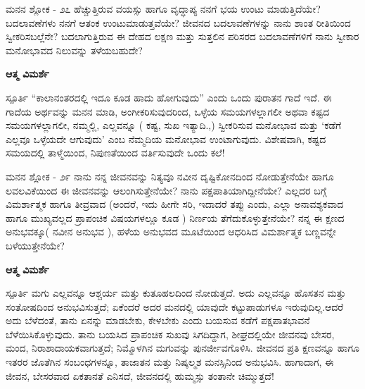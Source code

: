 \newpage
\begin{mananam}{\mananamfont \large ಮನನ ಶ್ಲೋಕ - ೨೭}
\footnotesize \mananamtext ಹೆಚ್ಚುತ್ತಿರುವ ವಯಸ್ಸು ಹಾಗೂ ವೃದ್ಧಾಪ್ಯ  ನನಗೆ ಭಯ ಉಂಟು ಮಾಡುತ್ತಿದೆಯೇ? ಬದಲಾವಣೆಗಳು ನನಗೆ ಆತಂಕ ಉಂಟುಮಾಡುತ್ತವೆಯೇ? ಜೀವನದ ಬದಲಾವಣೆಗಳನ್ನು ನಾನು ಶಾಂತ ರೀತಿಯಿಂದ ಸ್ವೀಕರಿಸಬಲ್ಲೆನೇ? ಬದಲಾಗುತ್ತಿರುವ ಈ ದೇಹದ ಲಕ್ಷಣ ಮತ್ತು ಸುತ್ತಲಿನ ಪರಿಸರದ ಬದಲಾವಣೆಗಳಿಗೆ ನಾನು ಸ್ವೀಕಾರ ಮನೋಭಾವದ ನಿಲುವನ್ನು ತಳೆಯಬಹುದೇ?
\end{mananam}
\WritingHand\enspace\textbf{ಆತ್ಮ ವಿಮರ್ಶೆ}
\begin{inspiration}{\mananamfont \large ಸ್ಪೂರ್ತಿ}
\footnotesize \mananamtext  “ಕಾಲಾನಂತರದಲ್ಲಿ ಇದೂ ಕೂಡ ಹಾದು ಹೋಗುವುದು”  ಎಂದು ಒಂದು ಪುರಾತನ ಗಾದೆ ಇದೆ. ಈ ಗಾದೆಯ ಅರ್ಥವನ್ನು ಮನನ ಮಾಡಿ, ಅಂಗೀಕರಿಸುವುದರಿಂದ,  ಒಳ್ಳೆಯ ಸಮಯಗಳಲ್ಲಾಗಲೀ ಅಥವಾ ಕಷ್ಟದ ಸಮಯಗಳಲ್ಲಾಗಲೀ, ನಮ್ಮಲ್ಲಿ, ಎಲ್ಲವನ್ನೂ ( ಕಷ್ಟ, ಸುಖ ಇತ್ಯಾದಿ.,) ಸ್ವೀಕರಿಸುವ ಮನೋಭಾವ ಮತ್ತು  ‘ಕಡೆಗೆ ಎಲ್ಲವೂ ಒಳ್ಳೆಯದೇ  ಆಗುವುದು’ ಎಂಬ ನೆಮ್ಮದಿಯ ಮನೋಭಾವ ಉಂಟಾಗುವುದು. ವಿಶೇಷವಾಗಿ, ಕಷ್ಟದ ಸಮಯದಲ್ಲಿ ತಾಳ್ಮೆಯಿಂದ, ನಿಪುಣತೆಯಿಂದ ವರ್ತಿಸುವುದೇ ಒಂದು ಕಲೆ!
\end{inspiration}
\newpage


\begin{mananam}{\mananamfont \large ಮನನ ಶ್ಲೋಕ - ೨೯}
\footnotesize \mananamtext ನಾನು ನನ್ನ ಜೀವನವನ್ನು ನಿತ್ಯವೂ ನವೀನ ದೃಷ್ಟಿಕೋನದಿಂದ ನೋಡುತ್ತೇನೆಯೇ ಹಾಗೂ ಲವಲವಿಕೆಯಿಂದ ಈ ಜೀವನವನ್ನು ಆಲಂಗಿಸುತ್ತೇನೆಯೇ? ನಾನು ಪಕ್ಷಪಾತಿಯಾಗಿದ್ದೀನೆಯೇ? ಎಲ್ಲದರ ಬಗ್ಗೆ ವಿಮರ್ಶಾತ್ಮಕ ಹಾಗೂ ತೀವ್ರವಾದ (ಅಂದರೆ, ಇದು ಹೀಗೇ ಸರಿ, ಇದಾದರೆ ತಪ್ಪು ಎಂದು, ಎಲ್ಲಾ ಅನಾವಶ್ಯಕವಾದ ಹಾಗೂ ಮುಖ್ಯವಲ್ಲದ ಪ್ರಾಪಂಚಿಕ ವಿಷಯಗಳಲ್ಲೂ ಕೂಡ ) ನಿರ್ಣಯ ತೆಗೆದುಕೊಳ್ಳುತ್ತೇನೆಯೇ? ನನ್ನ ಈ ಕ್ಷಣದ ಅನುಭವಕ್ಕೂ( ನವೀನ ಅನುಭವ ), ಹಳೆಯ  ಅನುಭವದ ಮೂಟೆಯಿಂದ ಆಧರಿಸಿದ ವಿಮರ್ಶಾತ್ಮಕ ಬಣ್ಣವನ್ನೇ ಬಳೆಯುತ್ತೇನೆಯೇ?
\end{mananam}
\WritingHand\enspace\textbf{ಆತ್ಮ ವಿಮರ್ಶೆ}
\begin{inspiration}{\mananamfont \large ಸ್ಪೂರ್ತಿ}
\ssmall \mananamtext ಮಗು ಎಲ್ಲವನ್ನೂ ಆಶ್ಚರ್ಯ ಮತ್ತು ಕುತೂಹಲದಿಂದ ನೋಡುತ್ತದೆ. ಅದು ಎಲ್ಲವನ್ನೂ ಹೊಸತನ ಮತ್ತು ಸಂತೋಷದಿಂದ ಅನುಭವಿಸುತ್ತದೆ; ಏಕೆಂದರೆ ಅದರ ಮನದಲ್ಲಿ ಯಾವುದೇ ಕಟ್ಟುಪಾಡುಗಳೂ ಇರುವುದಿಲ್ಲ.ಆದರೆ ಅದು ಬೆಳೆದಂತೆ, ತಾನು ಏನನ್ನು ಮಾಡಬೇಕು, ಕೇಳಬೇಕು ಎಂದು ಬಯಸುವ ಕಡೆಗೆ ಪಕ್ಷಪಾತಭಾವನೆ ಬೆಳೆಯಿಸಿಕೊಳ್ಳುವುದು. ತಾನು ಬಯಸಿದ ಪ್ರಾಪಂಚಿಕ ಸುಖವು ಸಿಗದಿದ್ದಾಗ,  ಶೀಘ್ರದಲ್ಲಿಯೇ ಜೀವನವು ಬೇಸರ, ಮಂದ, ನಿರಾಶಾದಾಯಕವಾಗುತ್ತದೆ; ನಿಮ್ಮೊಳಗಿನ ಮಗುವನ್ನು ಪುನರ್ಜೀವಗೊಳಿಸಿ. ಜೀವನದ ಪ್ರತಿ ಕ್ಷಣವನ್ನೂ ಹಾಗೂ ಇತರರ ಜೊತೆಗಿನ ಸಂಬಂಧಗಳನ್ನೂ, ತಾಜಾತನ ಮತ್ತು ನಿಷ್ಕಲ್ಮಶ ಮನಸ್ಸಿನಿಂದ ಅನುಭವಿಸಿ. ಹಾಗಾದಾಗ, ಈ ಜೀವನ, ಬೇಸರವಾದ ಏಕತಾನತೆ ಎನಿಸದೆ, ಜೀವನದಲ್ಲಿ ಹುಮ್ಮಸ್ಸು ತಂತಾನೇ ಚಿಮ್ಮುತ್ತದೆ!
\end{inspiration}
\newpage

